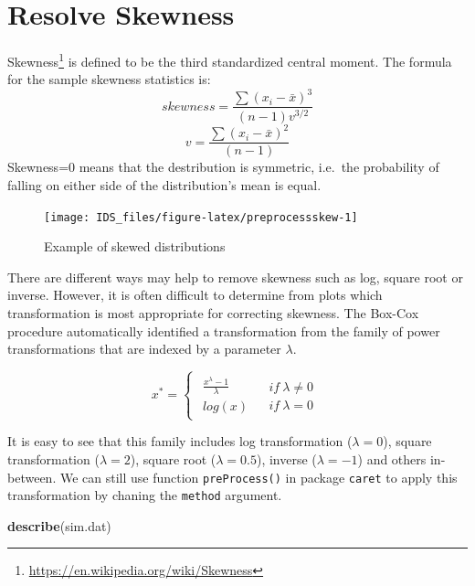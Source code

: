 \documentclass[12pt,]{krantz}
\makeatletter
\newenvironment{Shaded}{\begin{snugshade}}{\end{snugshade}}
\newcommand{\KeywordTok}[1]{\textcolor[rgb]{0.27,0.27,0.27}{\textbf{#1}}}
\newcommand{\NormalTok}[1]{#1}
\renewcommand{\href}[2]{#2\footnote{\url{#1}}}
\newenvironment{kframe}{%
\medskip{}
\setlength{\fboxsep}{.8em}
 \def\at@end@of@kframe{}%
 \ifinner\ifhmode%
  \def\at@end@of@kframe{\end{minipage}}%
  \begin{minipage}{\columnwidth}%
 \fi\fi%
 \def\FrameCommand##1{\hskip\@totalleftmargin \hskip-\fboxsep
 \colorbox{shadecolor}{##1}\hskip-\fboxsep
     \hskip-\linewidth \hskip-\@totalleftmargin \hskip\columnwidth}%
 \MakeFramed {\advance\hsize-\width
   \@totalleftmargin\z@ \linewidth\hsize
   \@setminipage}}%
 {\par\unskip\endMakeFramed%
 \at@end@of@kframe}
\renewenvironment{Shaded}{\begin{kframe}}{\end{kframe}}
\makeatother
\begin{document}
\hypertarget{resolve-skewness}{%
\section{Resolve Skewness}\label{resolve-skewness}}

\href{https://en.wikipedia.org/wiki/Skewness}{Skewness} is defined to be the third standardized central moment. The formula for the sample skewness statistics is:
\[ skewness=\frac{\sum(x_{i}-\bar{x})^{3}}{(n-1)v^{3/2}}\]
\[v=\frac{\sum(x_{i}-\bar{x})^{2}}{(n-1)}\]
Skewness=0 means that the destribution is symmetric, i.e.~the probability of falling on either side of the distribution's mean is equal.

\begin{figure}

{\centering \texttt{[image: IDS\_files/figure-latex/preprocessskew-1]} 

}

\caption{Example of skewed distributions}\label{fig:preprocessskew}
\end{figure}

There are different ways may help to remove skewness such as log, square root or inverse. However, it is often difficult to determine from plots which transformation is most appropriate for correcting skewness. The Box-Cox procedure automatically identified a transformation from the family of power transformations that are indexed by a parameter \(\lambda\)\citep{BOXCOX1}.

\[
x^{*}=\begin{cases}
\begin{array}{c}
\frac{x^{\lambda}-1}{\lambda}\\
log(x)
\end{array} & \begin{array}{c}
if\ \lambda\neq0\\
if\ \lambda=0
\end{array}\end{cases}
\]

It is easy to see that this family includes log transformation (\(\lambda=0\)), square transformation (\(\lambda=2\)), square root (\(\lambda=0.5\)), inverse (\(\lambda=-1\)) and others in-between. We can still use function \texttt{preProcess()} in package \texttt{caret} to apply this transformation by chaning the \texttt{method} argument.

\begin{Shaded}
\begin{Highlighting}[]
\KeywordTok{describe}\NormalTok{(sim.dat)}
\end{Highlighting}
\end{Shaded}
\end{document}
